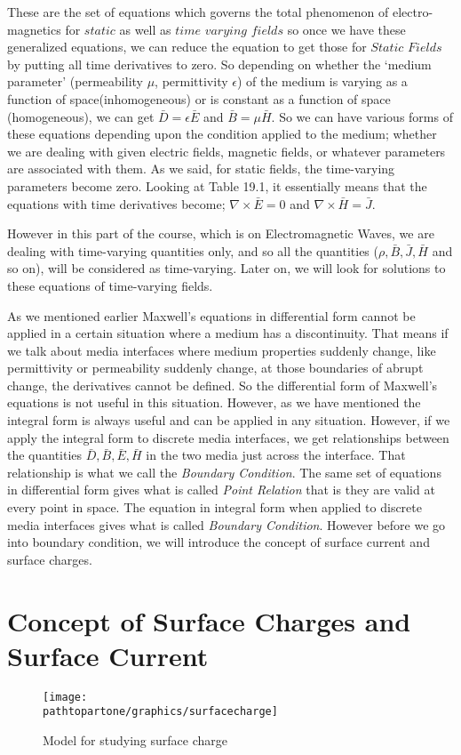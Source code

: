These are the set of equations which governs the total phenomenon of electro-magnetics for $static$ as well as $time$ $varying$ $fields$ so once we have these generalized equations, we can reduce the equation to get those for $Static$ $Fields$ by putting all time derivatives to zero. So depending on whether the `medium parameter' (permeability $\mu$, permittivity $\epsilon$) of the medium is varying as a function of space(inhomogeneous) or is constant as a function of space (homogeneous), we can get $\bar{D}=\epsilon\bar{E}$ and $\bar{B}=\mu\bar{H}$. So we can have various forms of these equations depending upon the condition applied to the medium; whether we are dealing with given electric fields, magnetic fields, or whatever parameters are associated with them. As we said, for static fields, the time-varying parameters become zero. Looking at Table 19.1, it essentially means that the equations with time derivatives become; $\nabla\times\bar{E}=0$ and $\nabla\times\bar{H}=\bar{J}$.

However in this part of the course, which is on Electromagnetic Waves, we are dealing with time-varying quantities only, and so all the quantities ($\rho,\bar{B},\bar{J},\bar{H}$ and so on), will be considered as time-varying. Later on, we will look for solutions to these equations of time-varying fields.

As we mentioned earlier Maxwell's equations in differential form cannot be applied in a certain situation where a medium has a discontinuity. That means if we talk about media interfaces where medium properties suddenly change, like permittivity or permeability suddenly change, at those boundaries of abrupt change, the derivatives cannot be defined. So the differential form of Maxwell's equations is not useful in this situation. However, as we have mentioned the integral form is always useful and can be applied in any situation. However, if we apply the integral form to discrete media interfaces, we get relationships between the quantities $\bar{D}, \bar{B}, \bar{E}, \bar{H}$ in the two media just across the interface. That relationship is what we call the \emph{Boundary Condition}. The same set of equations in differential form gives what is called \emph{Point Relation} that is they are valid at every point in space. The equation in integral form when applied to discrete media interfaces gives what is called \emph{Boundary Condition}. However before we go into boundary condition, we will introduce the concept of surface current and surface charges.

\section{Concept of Surface Charges and Surface Current}
\begin{figure}[h]
\centering
\texttt{[image: \\pathtopartone/graphics/surfacecharge]}
\caption{Model for studying surface charge}
\label{fig:surfacecharge}
\end{figure} 

